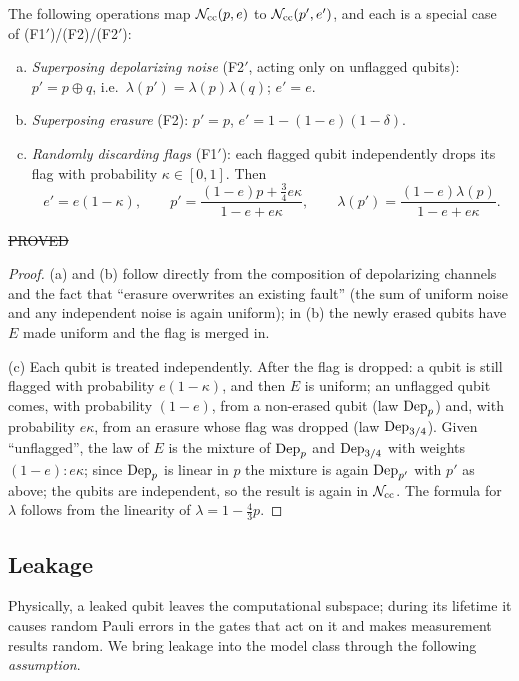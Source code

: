 \begin{lemma}\label{lem:basic-ops}
The following operations map $\mathcal{N}_{\rm cc}(p,e)$ to $\mathcal{N}_{\rm cc}(p',e')$, and each is a special case of (F1$'$)/(F2)/(F2$'$):
\begin{enumerate}[(a)]
\item \emph{Superposing depolarizing noise} (F2$'$, acting only on unflagged qubits): $p'=p\oplus q$, i.e.\ $\lambda(p')=\lambda(p)\lambda(q)$; $e'=e$.
\item \emph{Superposing erasure} (F2): $p'=p$, $e'=1-(1-e)(1-\delta)$.
\item \emph{Randomly discarding flags} (F1$'$): each flagged qubit independently drops its flag with probability $\kappa\in[0,1]$. Then
\[
e'=e(1-\kappa),\qquad p'=\frac{(1-e)p+\tfrac34 e\kappa}{1-e+e\kappa},\qquad
\lambda(p')=\frac{(1-e)\lambda(p)}{1-e+e\kappa}.
\]
\end{enumerate}
\hfill\st{PROVED}
\end{lemma}
\begin{proof}
(a) and (b) follow directly from the composition of depolarizing channels and the fact that ``erasure overwrites an existing fault'' (the sum of uniform noise and any independent noise is again uniform);
in (b) the newly erased qubits have $E$ made uniform and the flag is merged in.

(c) Each qubit is treated independently. After the flag is dropped: a qubit is still flagged with probability $e(1-\kappa)$, and then $E$ is uniform; an unflagged qubit comes, with probability
$(1-e)$, from a non-erased qubit (law $\mathrm{Dep}_p$) and, with probability $e\kappa$, from an erasure whose flag was dropped (law $\mathrm{Dep}_{3/4}$).
Given ``unflagged'', the law of $E$ is the mixture of $\mathrm{Dep}_p$ and $\mathrm{Dep}_{3/4}$ with weights $(1-e):e\kappa$;
since $\mathrm{Dep}_p$ is linear in $p$ the mixture is again $\mathrm{Dep}_{p'}$ with $p'$ as above; the qubits are independent, so the result is again in $\mathcal{N}_{\rm cc}$.
The formula for $\lambda$ follows from the linearity of $\lambda=1-\tfrac43p$.
\end{proof}

\subsection{Leakage}

Physically, a leaked qubit leaves the computational subspace; during its lifetime it causes random Pauli errors in the gates that act on it and makes measurement results random.
We bring leakage into the model class through the following \emph{assumption}.

